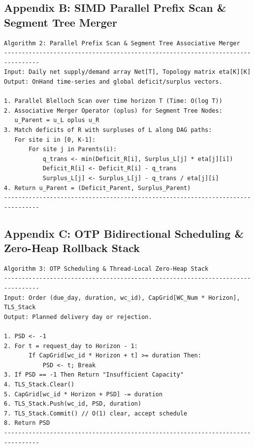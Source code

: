 \documentclass[11pt,a4paper]{article}
\begin{document}
\subsection*{Appendix B: SIMD Parallel Prefix Scan & Segment Tree Merger}
\begin{verbatim}
Algorithm 2: Parallel Prefix Scan & Segment Tree Associative Merger
--------------------------------------------------------------------------------
Input: Daily net supply/demand array Net[T], Topology matrix eta[K][K]
Output: OnHand time-series and global deficit/surplus vectors.

1. Parallel Blelloch Scan over time horizon T (Time: O(log T))
2. Associative Merger Operator (oplus) for Segment Tree Nodes:
   u_Parent = u_L oplus u_R
3. Match deficits of R with surpluses of L along DAG paths:
   For site i in [0, K-1]:
       For site j in Parents(i):
           q_trans <- min(Deficit_R[i], Surplus_L[j] * eta[j][i])
           Deficit_R[i] <- Deficit_R[i] - q_trans
           Surplus_L[j] <- Surplus_L[j] - q_trans / eta[j][i]
4. Return u_Parent = (Deficit_Parent, Surplus_Parent)
--------------------------------------------------------------------------------
\end{verbatim}

\subsection*{Appendix C: OTP Bidirectional Scheduling & Zero-Heap Rollback Stack}
\begin{verbatim}
Algorithm 3: OTP Scheduling & Thread-Local Zero-Heap Stack
--------------------------------------------------------------------------------
Input: Order (due_day, duration, wc_id), CapGrid[WC_Num * Horizon], TLS_Stack
Output: Planned delivery day or rejection.

1. PSD <- -1
2. For t = request_day to Horizon - 1:
       If CapGrid[wc_id * Horizon + t] >= duration Then:
           PSD <- t; Break
3. If PSD == -1 Then Return "Insufficient Capacity"
4. TLS_Stack.Clear()
5. CapGrid[wc_id * Horizon + PSD] -= duration
6. TLS_Stack.Push(wc_id, PSD, duration)
7. TLS_Stack.Commit() // O(1) clear, accept schedule
8. Return PSD
--------------------------------------------------------------------------------
\end{verbatim}
\end{document}
